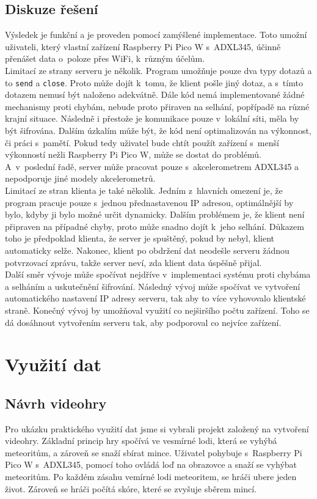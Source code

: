 \documentclass[12pt]{report}			%
\begin{document}
\subsection{Diskuze řešení}
Výsledek je funkční a je proveden pomocí zamýšlené implementace. Toto umožní uživateli, který vlastní zařízení Raspberry Pi Pico W s~ADXL345, účinně přenášet data o~poloze přes WiFi, k~různým účelům. 
\\
Limitací ze strany serveru je několik.
 Program umožňuje pouze dva typy dotazů a to \texttt{send} a \texttt{close}. Proto může dojít k~tomu, že klient pošle jiný dotaz, a s~tímto dotazem nemusí být naloženo adekvátně. Dále kód nemá implementované žádné mechanismy proti chybám, nebude proto přiraven na selhání, popřípadě na různé krajní situace. Následně i přestože je komunikace pouze v~lokální síti, měla by být šifrována. Dalším úzkalím může být, že kód není optimalizován na výkonnost, či práci s~pamětí. Pokud tedy uživatel bude chtít použít zařízení s~menší výkonností nežli Raspberry Pi Pico W, může se dostat do problémů. A~v~poslední řadě, server může pracovat pouze s~akcelerometrem ADXL345 a nepodporuje jiné modely akcelerometrů.
\\
Limitací ze stran klienta je také několik. Jedním z~hlavních omezení je, že program pracuje pouze s~jednou přednastavenou IP adresou, optimálnější by bylo, kdyby ji bylo možné určit dynamicky. Dalším problémem je, že klient není připraven na případné chyby, proto může snadno dojít k~jeho selhání. Důkazem toho je předpoklad klienta, že server je spuštěný, pokud by nebyl, klient automaticky selže. Nakonec, klient po obdržení dat neodešle serveru žádnou potvrzovací zprávu, takže server neví, zda klient data úspěšně přijal. 
\\
Další směr vývoje může spočívat nejdříve v~implementaci systému proti chybáma a selháním a uskutečnění šifrování. Následný vývoj může spočívat ve vytvoření automatického nastavení IP adresy serveru, tak aby to  více vyhovovalo klientské straně. Konečný vývoj by umožňoval využití co nejširšího počtu zařízení. Toho se dá dosáhnout vytvořením serveru tak, aby podporoval co nejvíce zařízení. 

\section{Využití dat}
\subsection{Návrh videohry}
Pro ukázku praktického využití dat jsme si vybrali projekt založený na vytvoření videohry. Základní princip hry spočívá ve vesmírné lodi, která se vyhýbá meteoritům, a zároveň se snaží sbírat mince. Uživatel pohybuje s~Raspberry Pi Pico W s~ADXL345, pomocí toho ovládá loď na obrazovce a snaží se vyhýbat meteoritům. Po každém zásahu vemírné lodi meteoritem, se hráči ubere jeden život. Zároveň se hráči počítá skóre, které se zvyšuje sběrem mincí.
 
\end{document}
